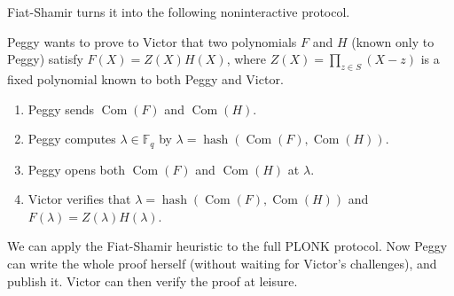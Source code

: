 Fiat-Shamir turns it into the following noninteractive protocol.

\begin{algorithm}
Peggy wants to prove to Victor that two polynomials \(F\) and \(H\)
(known only to Peggy) satisfy \(F(X) = Z(X)H(X)\), where
\(Z(X) = \prod_{z \in S}(X - z)\) is a fixed polynomial known to both
Peggy and Victor.

\begin{enumerate}
\item
  Peggy sends \(\operatorname{Com}(F)\) and \(\operatorname{Com}(H)\).
\item
  Peggy computes \(\lambda \in {\mathbb{F}}_{q}\) by
  \(\lambda = \operatorname{hash}(\operatorname{Com}(F),\operatorname{Com}(H))\).
\item
  Peggy opens both \(\operatorname{Com}(F)\) and
  \(\operatorname{Com}(H)\) at \(\lambda\).
\item
  Victor verifies that
  \(\lambda = \operatorname{hash}(\operatorname{Com}(F),\operatorname{Com}(H))\)
  and \(F(\lambda) = Z(\lambda)H(\lambda)\).
\end{enumerate}
\end{algorithm}

We can apply the Fiat-Shamir heuristic to the full PLONK protocol. Now
Peggy can write the whole proof herself (without waiting for Victor's
challenges), and publish it. Victor can then verify the proof at
leisure.
